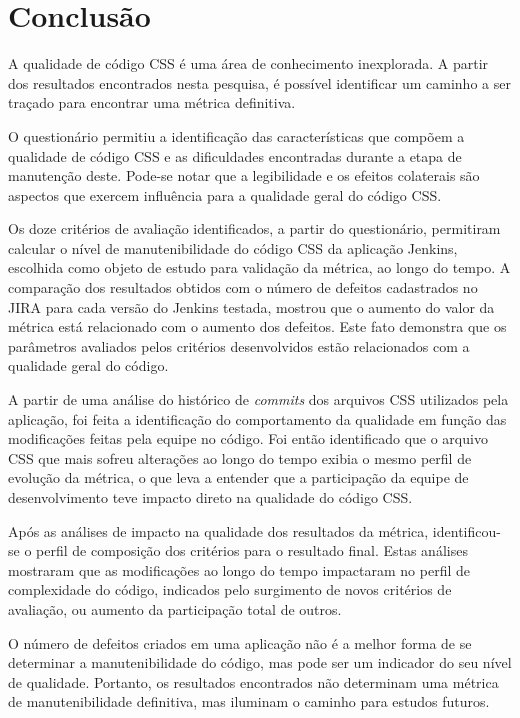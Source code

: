 %
%

\chapter{Conclusão}

A qualidade de código CSS é uma área de conhecimento inexplorada. A partir dos resultados encontrados nesta pesquisa, é possível identificar um caminho a ser traçado para encontrar uma métrica definitiva.


O questionário permitiu a identificação das características que compõem a qualidade de código CSS e as dificuldades encontradas durante a etapa de manutenção deste. Pode-se notar que a legibilidade e os efeitos colaterais são aspectos que exercem influência para a qualidade geral do código CSS. 

Os doze critérios de avaliação identificados, a partir do questionário, permitiram calcular o nível de manutenibilidade do código CSS da aplicação Jenkins, escolhida como objeto de estudo para validação da métrica, ao longo do tempo. A comparação dos resultados obtidos com o número de defeitos cadastrados no JIRA para cada versão do Jenkins testada, mostrou que o aumento do valor da métrica está relacionado com o aumento dos defeitos. Este fato demonstra que os parâmetros avaliados pelos critérios desenvolvidos estão relacionados com a qualidade geral do código.

A partir de uma análise do histórico de \textit{commits} dos arquivos CSS utilizados pela aplicação, foi feita a identificação do comportamento da qualidade em função das modificações feitas pela equipe no código. Foi então identificado que o arquivo CSS que mais sofreu alterações ao longo do tempo exibia o mesmo perfil de evolução da métrica, o que leva a entender que a participação da equipe de desenvolvimento teve impacto direto na qualidade do código CSS. %

Após as análises de impacto na qualidade dos resultados da métrica, identificou-se o perfil de composição dos critérios para o resultado final. Estas análises mostraram que as modificações ao longo do tempo impactaram no perfil de complexidade do código, indicados pelo surgimento de novos critérios de avaliação, ou aumento da participação total de outros.

O número de defeitos criados em uma aplicação não é a melhor forma de se determinar a manutenibilidade do código, mas pode ser um indicador do seu nível de qualidade. Portanto, os resultados encontrados não determinam uma métrica de manutenibilidade definitiva, mas iluminam o caminho para estudos futuros.


